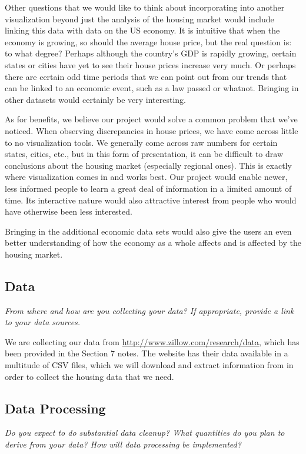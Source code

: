 \documentclass[12pt]{article}
\begin{document}
Other questions that we would like to think about incorporating into another visualization beyond just the analysis of the housing market would include linking this data with data on the US economy. It is intuitive that when the economy is growing, so should the average house price, but the real question is: to what degree? Perhaps although the country's GDP is rapidly growing, certain states or cities have yet to see their house prices increase very much. Or perhaps there are certain odd time periods that we can point out from our trends that can be linked to an economic event, such as a law passed or whatnot. Bringing in other datasets would certainly be very interesting.

As for benefits, we believe our project would solve a common problem that we've noticed. When observing discrepancies in house prices, we have come across little to no visualization tools. We generally come across raw numbers for certain states, cities, etc., but in this form of presentation, it can be difficult to draw conclusions about the housing market (especially regional ones). This is exactly where visualization comes in and works best. Our project would enable newer, less informed people to learn a great deal of information in a limited amount of time. Its interactive nature would also attractive interest from people who would have otherwise been less interested. 

Bringing in the additional economic data sets would also give the users an even better understanding of how the economy as a whole affects and is affected by the housing market. 

\subsection*{Data}
\vspace{-3mm}
{\it From where and how are you collecting your data? If appropriate, provide a link to your data sources.}

We are collecting our data from \url{http://www.zillow.com/research/data}, which has been provided in the Section 7 notes. The website has their data available in a multitude of CSV files, which we will download and extract information from in order to collect the housing data that we need.

\subsection*{Data Processing}
\vspace{-3mm}
{\it Do you expect to do substantial data cleanup? What quantities do you plan to derive from your data? How will data processing be implemented?}
\end{document}
